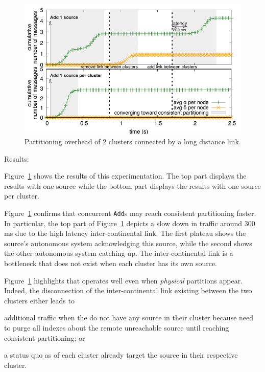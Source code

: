 \begin{asparadesc}
\begin{figure}[t]
  \centering\includegraphics[width=\FIGSCALE\columnwidth]{img/as_cast_geant.pdf}
  \caption{\label{fig:geant}Partitioning overhead of 2
    clusters connected by a long distance link.}
\end{figure}




\item [Results:]

Figure~\ref{fig:geant} shows the results of this experimentation. The
top part displays the results with one source while the bottom part
displays the results with one source per cluster.

\noindent Figure~\ref{fig:geant} confirms that concurrent
\texttt{Add}s may reach consistent partitioning faster. In particular,
the top part of Figure~\ref{fig:geant} depicts a slow down in traffic
around $300$ ms due to the high latency inter-continental link. The
first plateau shows the source's autonomous system acknowledging this
source, while the second shows the other autonomous system catching
up.  The inter-continental link is a bottleneck that does not exist
when each cluster has its own source.

\noindent Figure~\ref{fig:geant} highlights that \NAME operates well
even when \emph{physical} partitions appear. Indeed, the disconnection
of the inter-continental link existing between the two clusters
either leads to 
\begin{inparaenum}[(i)]
\item additional traffic when the \processes do not have any source in
  their cluster because \processes need to purge all indexes about the
  remote unreachable source until reaching consistent partitioning; or
  \item a status quo as \processes of each 
  cluster already target the source in their respective cluster.
\end{inparaenum}


\end{asparadesc}
